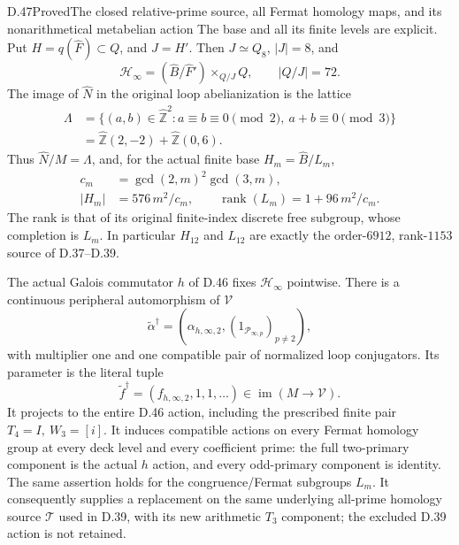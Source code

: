 \begin{statement}{D.47}{Proved}{The closed relative-prime source, all Fermat homology maps, and its nonarithmetical metabelian action}
The base and all its finite levels are explicit. Put
\(H=q(\widehat F)\subset Q\), and \(J=H'\).
Then \(J\simeq Q_8\), \(|J|=8\), and
\[
 \mathcal H_\infty
   =(\widehat B/\widehat F')
                         \times_{Q/J}Q,\qquad |Q/J|=72.
                                                               \tag{D.47.4}
\]
The image of \(\widehat N\) in the original loop
abelianization is the lattice
\[
 \begin{aligned}
 \Lambda
   &=\{(a,b)\in\widehat{\mathbb Z}^2:
           a\equiv b\equiv0\pmod2,\ a+b\equiv0\pmod3\}\\
   &=\widehat{\mathbb Z}(2,-2)
                           +\widehat{\mathbb Z}(0,6).
 \end{aligned}                                                   \tag{D.47.5}
\]
Thus \(\widehat N/M=\Lambda\), and, for the actual
finite base \(H_m=\widehat B/L_m\),
\[
 \begin{aligned}
 c_m&=\gcd(2,m)^2\gcd(3,m),\\
 |H_m|&=576\,m^2/c_m,\qquad
 \operatorname{rank}(L_m)=1+96\,m^2/c_m .
 \end{aligned}                                                   \tag{D.47.6}
\]
The rank is that of its original finite-index discrete
free subgroup, whose completion is \(L_m\).
In particular \(H_{12}\) and \(L_{12}\) are exactly
the order-\(6912\), rank-\(1153\) source of D.37--D.39.

The actual Galois commutator \(h\) of D.46 fixes
\(\mathcal H_\infty\) pointwise. There is a continuous
peripheral automorphism of \(\mathcal V\)
\[
             \widetilde\alpha^\dagger
                =(\alpha_{h,\infty,2},
                            (1_{\mathcal P_{\infty,p}})_{p\ne2}),
                                                               \tag{D.47.7}
\]
with multiplier one and one compatible pair of normalized
loop conjugators. Its parameter is the literal tuple
\[
          \widetilde f^\dagger=(f_{h,\infty,2},1,1,\ldots)
                            \in\operatorname{im}(M\to\mathcal V).
                                                               \tag{D.47.8}
\]
It projects to the entire D.46 action, including the
prescribed finite pair \(T_4=I,\ W_3=[i]\).
It induces compatible actions on every Fermat homology
group at every deck level and every coefficient prime:
the full two-primary component is the actual \(h\)
action, and every odd-primary component is identity.
The same assertion holds for the congruence/Fermat
subgroups \(L_m\). It consequently supplies a replacement
on the same underlying all-prime homology source
\(\mathcal T\) used in D.39, with its new arithmetic
\(T_3\) component; the excluded D.39 action is not
retained.


\end{statement}
